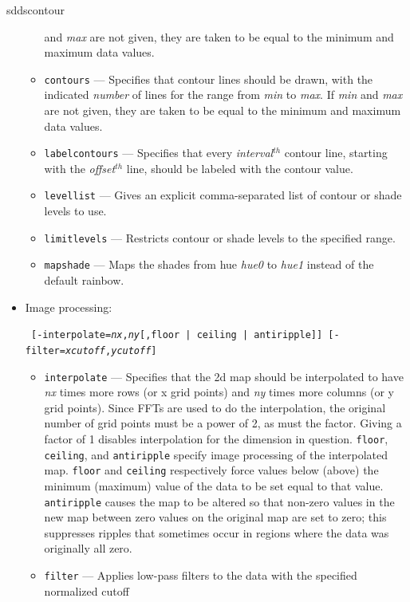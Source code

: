 \begin{sddsprog}{sddscontour}
\begin{itemize}
\begin{itemize}
        and {\em max} are not given, they are taken to be equal to the minimum and maximum data values.
        \item \verb|contours| --- Specifies that contour lines should be drawn, with the
        indicated {\em number} of lines for the range from {\em min} to {\em max}.  If {\em min}
        and {\em max} are not given, they are taken to be equal to the minimum and maximum data values.
        \item \verb|labelcontours| --- Specifies that every {\em interval}$^{th}$ contour line, starting with
        the {\em offset}$^{th}$ line, should be labeled with the contour value.
        \item \verb|levellist| --- Gives an explicit comma-separated list of contour or shade levels to use.
        \item \verb|limitlevels| --- Restricts contour or shade levels to the specified range.
        \item \verb|mapshade| --- Maps the shades from hue {\em hue0} to {\em hue1} instead of the default rainbow.
        \end{itemize}
    \item Image processing:
\begin{flushleft}{\tt
[-interpolate={\em nx},{\em ny}[,{floor | ceiling | antiripple}]] [-filter={\em xcutoff},{\em ycutoff}]
}\end{flushleft}
        \begin{itemize}
        \item \verb|interpolate| --- Specifies that the 2d map should be interpolated to have {\em nx} times
        more rows (or x grid points) and {\em ny} times more columns (or y grid points).  Since FFTs are used to
        do the interpolation, the original number of grid points must be a power of 2, as must the factor.  Giving
        a factor of 1 disables interpolation for the dimension in question.  \verb|floor|, \verb|ceiling|,
        and \verb|antiripple| specify image processing of the interpolated map.  \verb|floor| and \verb|ceiling|
        respectively force values below (above) the minimum (maximum) value of the data to be set equal to that
        value.  \verb|antiripple| causes the map to be altered so that non-zero values in the new map between
        zero values on the original map are set to zero; this suppresses ripples that sometimes occur in regions
        where the data was originally all zero.
        \item \verb|filter| --- Applies low-pass filters to the data with the specified normalized cutoff

\end{itemize}
\end{itemize}
\end{sddsprog}

